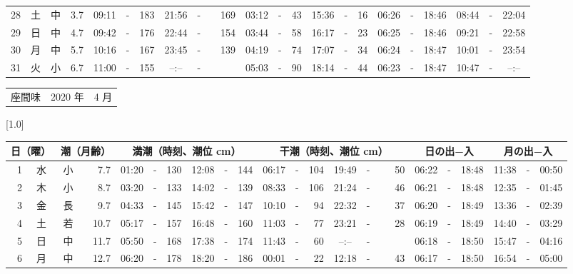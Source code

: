 \documentclass[12pt,a4j]{jsarticle}
\begin{document}
\begin{table}[htbp]
\begin{center}
{\begin{tabular}{|rc|cr|ccrccr|ccrccr|ccc|ccc|}
28 & 土 & 中 &  3.7 &  09:11 &-& 183 &  21:56 &-& 169 &  03:12 &-&  43 &  15:36 &-&  16 & 06:26 & -& 18:46 & 08:44 & -& 22:04 \\
29 & 日 & 中 &  4.7 &  09:42 &-& 176 &  22:44 &-& 154 &  03:44 &-&  58 &  16:17 &-&  23 & 06:25 & -& 18:46 & 09:21 & -& 22:58 \\
30 & 月 & 中 &  5.7 &  10:16 &-& 167 &  23:45 &-& 139 &  04:19 &-&  74 &  17:07 &-&  34 & 06:24 & -& 18:47 & 10:01 & -& 23:54 \\
31 & 火 & 小 &  6.7 &  11:00 &-& 155 &  --:-- &-&~~~~~ &  05:03 &-&  90 &  18:14 &-&  44 & 06:23 & -& 18:47 & 10:47 & -& --:-- \\
   \hline
   \end{tabular}}
   \end{center}
\end{table}
\newpage
 \begin{table}[htbp]
 \begin{center}
 \begin{tabular}{lcc}
 \LARGE{座間味}  & \large{2020 年} & \large{ 4 月} \\
 \end{tabular}
 \end{center}
 \begin{center}
    \scalebox{0.7}[1.0]{
    \begin{tabular}{|rc|cr|ccrccr|ccrccr|ccc|ccc|}
    \hline
    \multicolumn{2}{|c|}{日（曜）} & \multicolumn{2}{c|}{潮（月齢）} & \multicolumn{6}{c|}{満潮（時刻、潮位 cm）} & \multicolumn{6}{c|}{干潮（時刻、潮位 cm）} & \multicolumn{3}{c|}{日の出−入} &  \multicolumn{3}{c|}{月の出−入}\\
 \hline
 1 & 水 & 小 &  7.7 &  01:20 &-& 130 &  12:08 &-& 144 &  06:17 &-& 104 &  19:49 &-&  50 & 06:22 & -& 18:48 & 11:38 & -& 00:50 \\
 2 & 木 & 小 &  8.7 &  03:20 &-& 133 &  14:02 &-& 139 &  08:33 &-& 106 &  21:24 &-&  46 & 06:21 & -& 18:48 & 12:35 & -& 01:45 \\
 3 & 金 & 長 &  9.7 &  04:33 &-& 145 &  15:42 &-& 147 &  10:10 &-&  94 &  22:32 &-&  37 & 06:20 & -& 18:49 & 13:36 & -& 02:39 \\
 4 & 土 & 若 & 10.7 &  05:17 &-& 157 &  16:48 &-& 160 &  11:03 &-&  77 &  23:21 &-&  28 & 06:19 & -& 18:49 & 14:40 & -& 03:29 \\
 5 & 日 & 中 & 11.7 &  05:50 &-& 168 &  17:38 &-& 174 &  11:43 &-&  60 &  --:-- &-&~~~~~ & 06:18 & -& 18:50 & 15:47 & -& 04:16 \\
 6 & 月 & 中 & 12.7 &  06:20 &-& 178 &  18:20 &-& 186 &  00:01 &-&  22 &  12:18 &-&  43 & 06:17 & -& 18:50 & 16:54 & -& 05:00 \\

\end{tabular}}
\end{center}
\end{table}
\end{document}
